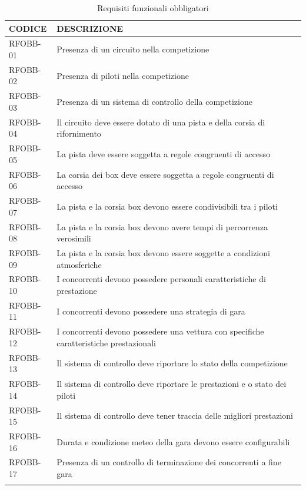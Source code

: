 \documentclass[a4paper,11pt, twoside]{book}
\begin{document}
    \begin{longtable}{|p{2cm}|p{8cm}|}
      \toprule
	\bfseries{CODICE} & \bfseries{DESCRIZIONE} \\\hline
      \endfirsthead
      RFOBB-01 & Presenza di un circuito nella competizione \\\hline
      RFOBB-02 & Presenza di piloti nella competizione \\\hline 
      RFOBB-03 & Presenza di un sistema di controllo della competizione \\\hline
      RFOBB-04 & Il circuito deve essere dotato di una pista e della corsia di rifornimento \\\hline
      RFOBB-05 & La pista deve essere soggetta a regole congruenti di accesso \\\hline
      RFOBB-06 & La corsia dei box deve essere soggetta a regole congruenti di accesso \\\hline
      RFOBB-07 & La pista e la corsia box devono essere condivisibili tra i piloti \\\hline
      RFOBB-08 & La pista e la corsia box devono avere tempi di percorrenza verosimili \\\hline
      RFOBB-09 & La pista e la corsia box devono essere soggette a condizioni atmosferiche \\\hline
      RFOBB-10 & I concorrenti devono possedere personali caratteristiche di prestazione  \\\hline
      RFOBB-11 & I concorrenti devono possedere una strategia di gara  \\\hline
      RFOBB-12 & I concorrenti devono possedere una vettura con specifiche caratteristiche prestazionali  \\\hline
      RFOBB-13 & Il sistema di controllo deve riportare lo stato della competizione  \\\hline
      RFOBB-14 & Il sistema di controllo deve riportare le prestazioni e o stato dei piloti  \\\hline
      RFOBB-15 & Il sistema di controllo deve tener traccia delle migliori prestazioni  \\\hline
      RFOBB-16 & Durata e condizione meteo della gara devono essere configurabili  \\\hline
      RFOBB-17 & Presenza di un controllo di terminazione dei concorrenti a fine gara  \\\hline
      \caption{Requisiti funzionali obbligatori}
      \label{tbl:RequisitiFunzionaliObbligatori}
    \end{longtable}
\end{document}
